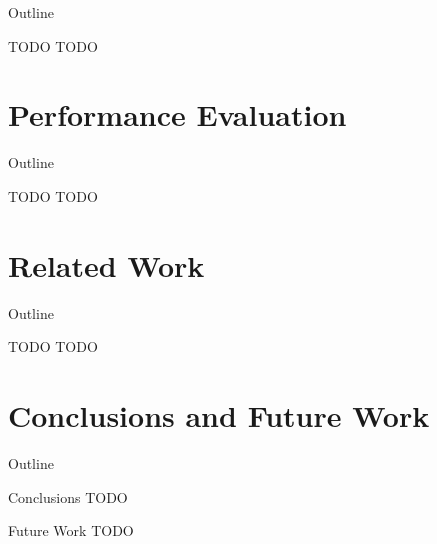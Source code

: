 \begin{frame}{Outline}
  \tableofcontents[current]
\end{frame}

\note{
}

\begin{frame}{TODO}
  TODO
\end{frame}

\note{
}


\section{Performance Evaluation}

\begin{frame}{Outline}
  \tableofcontents[current]
\end{frame}

\note{
}

\begin{frame}{TODO}
  TODO
\end{frame}

\note{
}


\section{Related Work}

\begin{frame}{Outline}
  \tableofcontents[current]
\end{frame}

\note{
}

\begin{frame}{TODO}
  TODO
\end{frame}

\note{
}


\section{Conclusions and Future Work}

\begin{frame}{Outline}
  \tableofcontents[current]
\end{frame}

\note{
}

\begin{frame}{Conclusions}
  TODO
\end{frame}

\note{
}

\begin{frame}{Future Work}
  TODO
\end{frame}

